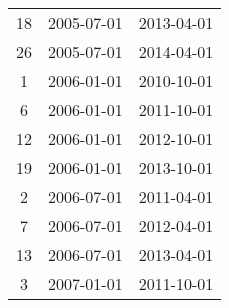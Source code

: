 \begin{tabular}{ccc}
  18 & 2005-07-01 & 2013-04-01 \\ 
  26 & 2005-07-01 & 2014-04-01 \\ 
  1 & 2006-01-01 & 2010-10-01 \\ 
  6 & 2006-01-01 & 2011-10-01 \\ 
  12 & 2006-01-01 & 2012-10-01 \\ 
  19 & 2006-01-01 & 2013-10-01 \\ 
  2 & 2006-07-01 & 2011-04-01 \\ 
  7 & 2006-07-01 & 2012-04-01 \\ 
  13 & 2006-07-01 & 2013-04-01 \\ 
  3 & 2007-01-01 & 2011-10-01 \\ 
   \hline
\end{tabular}
